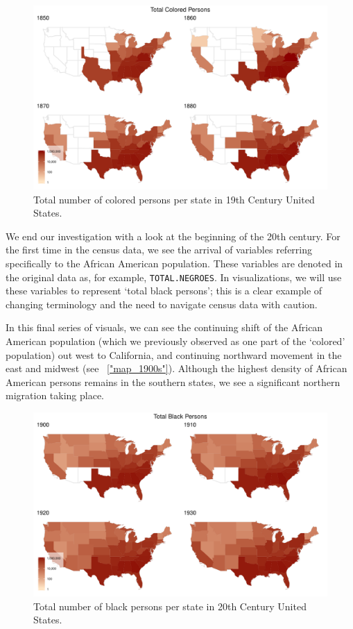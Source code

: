 \documentclass[DIV=calc, paper=a4, fontsize=10pt, twocolumn]{scrartcl}\usepackage[]{graphicx}\usepackage[]{color}
\newenvironment{knitrout}{}{} %
\begin{document}
\begin{knitrout}
\color{fgcolor}\begin{figure}[h]
\includegraphics[width=.5\textwidth]{figure/map_1800s-1} \caption[Total number of colored persons per state in 19th Century United States]{Total number of colored persons per state in 19th Century United States.}\label{fig:map_1800s}
\end{figure}


\end{knitrout}

\par We end our investigation with a look at the beginning of the 20th century. For the first time in the census data, we see the arrival of variables referring specifically to the African American population. These variables are denoted in the original data as, for example, \texttt{TOTAL.NEGROES}. In visualizations, we will use these variables to represent `total black persons'; this is a clear example of changing terminology and the need to navigate census data with caution. 

\par In this final series of visuals, we can see the continuing shift of the African American population (which we previously observed as one part of the `colored' population) out west to California, and continuing northward movement in the east and midwest (see ~\autoref{"map_1900s"}). Although the highest density of African American persons remains in the southern states, we see a significant northern migration taking place. 


\begin{knitrout}
\color{fgcolor}\begin{figure}[h]
\includegraphics[width=.5\textwidth]{figure/map_1900s-1} \caption[Total number of black persons per state in 20th Century United States]{Total number of black persons per state in 20th Century United States.}\label{fig:map_1900s}
\end{figure}


\end{knitrout}
\end{document}
